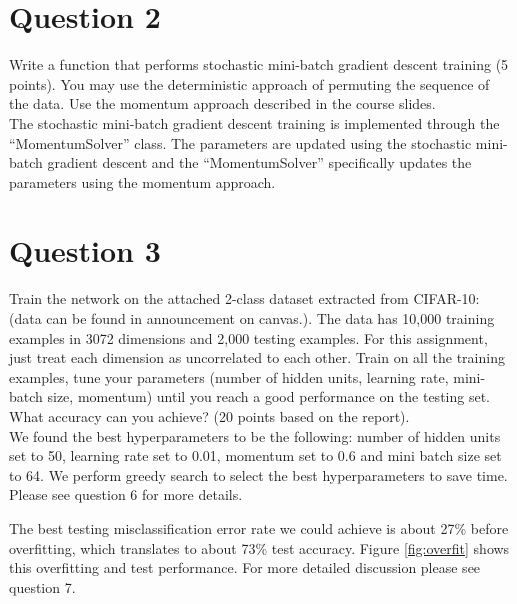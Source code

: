 \documentclass[paper=a4, fontsize=11pt]{scrartcl}
\begin{document}
\section{Question 2}

{\small Write a function that performs stochastic mini-batch gradient descent training (5 points). You may use the deterministic approach of permuting the sequence of the data. Use the momentum approach described in the course slides.}\\

The stochastic mini-batch gradient descent training is implemented through the ``MomentumSolver'' class.  The parameters are updated using the stochastic mini-batch gradient descent and the ``MomentumSolver'' specifically updates the parameters using the momentum approach.

\section{Question 3}

{\small Train the network on the attached 2-class dataset extracted from CIFAR-10: (data can be found in announcement on canvas.). The data has 10,000 training examples in 3072 dimensions and 2,000 testing examples. For this assignment, just treat each dimension as uncorrelated to each other. Train on all the training examples, tune your parameters (number of hidden units, learning rate, mini-batch size, momentum) until you reach a good performance on the testing set. What accuracy can you achieve? (20 points based on the report).}\\

We found the best hyperparameters to be the following: number of hidden units set to 50, learning rate set to 0.01, momentum set to 0.6 and mini batch size set to 64. We perform greedy search to select the best hyperparameters to save time. Please see question 6 for more details.

The best testing misclassification error rate we could achieve is about 27\% before overfitting, which translates to about 73\% test accuracy.  Figure \ref{fig:overfit} shows this overfitting and test performance.  For more detailed discussion please see question 7.
\end{document}
